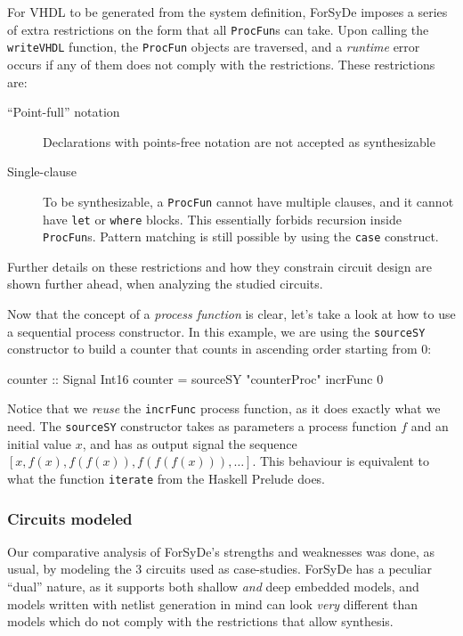             For VHDL to be generated from the system definition, ForSyDe imposes a series of extra
            restrictions on the form that all \texttt{ProcFun}s can take. Upon calling the
            \texttt{writeVHDL} function, the \texttt{ProcFun} objects are traversed, and a
            \emph{runtime} error occurs if any of them does not comply with the restrictions.  These
            restrictions are:

            \begin{description}
                \item[``Point-full'' notation] Declarations with points-free notation are not
                    accepted as synthesizable

                \item[Single-clause] To be synthesizable, a \texttt{ProcFun} cannot have multiple
                    clauses, and it cannot have \texttt{let} or \texttt{where} blocks.  This
                    essentially forbids recursion inside \texttt{ProcFun}s. Pattern matching is
                    still possible by using the \texttt{case} construct.
            \end{description}

            Further details on these restrictions and how they constrain circuit design are shown
            further ahead, when analyzing the studied circuits.

            Now that the concept of a \emph{process function} is clear, let's take a look at how to
            use a sequential process constructor. In this example, we are using the
            \texttt{sourceSY} constructor to build a counter that counts in ascending order starting
            from 0:

            \begin{haskellcode}
        counter :: Signal Int16
        counter = sourceSY "counterProc" incrFunc 0
            \end{haskellcode}

            Notice that we \emph{reuse} the \texttt{incrFunc} process function, as it does exactly
            what we need. The \texttt{sourceSY} constructor takes as parameters a process function
            $f$ and an initial value $x$, and has as output signal the sequence $ [x, f(x), f(f(x)),
            f(f(f(x))), \ldots] $. This behaviour is equivalent to what the function
            \texttt{iterate} from the Haskell Prelude does.


        \subsubsection{Circuits modeled}
        \label{subsubsec:forsyde-circuits}
            Our comparative analysis of ForSyDe's strengths and weaknesses was done, as usual, by
            modeling the 3 circuits used as case-studies. ForSyDe has a peculiar ``dual'' nature,
            as it supports both shallow \emph{and} deep embedded models, and models written with
            netlist generation in mind can look \emph{very} different than models which do not
            comply with the restrictions that allow synthesis.

